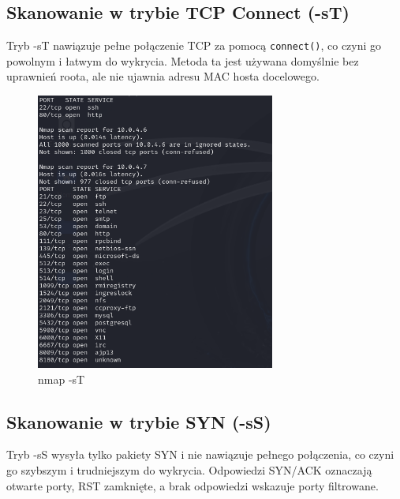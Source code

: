 \documentclass{article}
\begin{document}
\subsection*{Skanowanie w trybie TCP Connect (-sT)}
Tryb -sT nawiązuje pełne połączenie TCP za pomocą \texttt{connect()}, co czyni go powolnym i łatwym do wykrycia. Metoda ta jest używana domyślnie bez uprawnień roota, ale nie ujawnia adresu MAC hosta docelowego.

\begin{figure}[H]
  \centering
  \includegraphics[width=0.7\textwidth]{nmap_st.png}
  \caption{nmap -sT}
\end{figure}

\subsection*{Skanowanie w trybie SYN (-sS)}
Tryb -sS wysyła tylko pakiety SYN i nie nawiązuje pełnego połączenia, co czyni go szybszym i trudniejszym do wykrycia. Odpowiedzi SYN/ACK oznaczają otwarte porty, RST zamknięte, a brak odpowiedzi wskazuje porty filtrowane.
\end{document}
